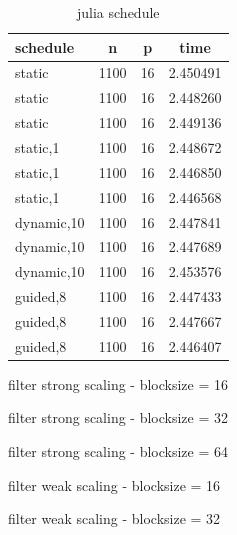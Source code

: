 \documentclass[a4paper,%
7pt,%
DIV12,
headsepline,%
headings=normal,
]{scrartcl}
\begin{document}
\begin{table}[htbp]
    \centering
    \begin{tabular}{|l|c|c|c|}
        \hline
        schedule & n & p & time \\
        \hline
        static & 1100 & 16 & 2.450491 \\
        static & 1100 & 16 & 2.448260 \\
        static & 1100 & 16 & 2.449136 \\
        static,1 & 1100 & 16 & 2.448672 \\
        static,1 & 1100 & 16 & 2.446850 \\
        static,1 & 1100 & 16 & 2.446568 \\
        dynamic,10 & 1100 & 16 & 2.447841 \\
        dynamic,10 & 1100 & 16 & 2.447689 \\
        dynamic,10 & 1100 & 16 & 2.453576 \\
        guided,8 & 1100 & 16 & 2.447433 \\
        guided,8 & 1100 & 16 & 2.447667 \\
        guided,8 & 1100 & 16 & 2.446407 \\
        \hline
    \end{tabular}
    \caption{julia schedule}
\end{table}

\begin{table}[htbp]
\centering
{}
\caption{filter strong scaling - blocksize = 16}
\label{tab:label1}
\end{table}

\begin{table}[htbp]
\centering
{}
\caption{filter strong scaling - blocksize = 32}
\label{tab:label2}
\end{table}

\begin{table}[htbp]
\centering
{}
\caption{filter strong scaling - blocksize = 64}
\label{tab:label3}
\end{table}

\begin{table}[htbp]
\centering
{}
\caption{filter weak scaling - blocksize = 16}
\label{tab:label4}
\end{table}

\begin{table}[htbp]
\centering
{}
\caption{filter weak scaling - blocksize = 32}
\label{tab:label5}
\end{table}
\end{document}

